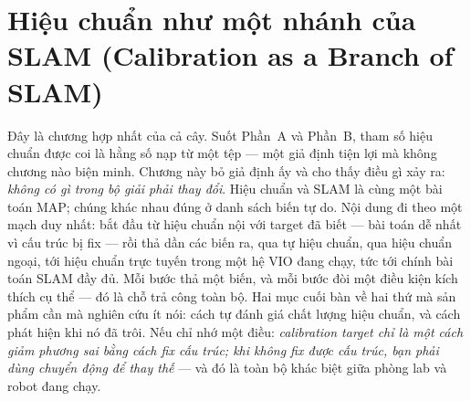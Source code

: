 \documentclass[../../vslam.tex]{subfiles}
\begin{document}
\chapter{Hiệu chuẩn như một nhánh của SLAM (Calibration as a Branch of SLAM)}

\begin{tomtat}
Đây là chương hợp nhất của cả cây. Suốt Phần~A và Phần~B, tham số hiệu chuẩn được coi là hằng số nạp từ một tệp --- một giả định tiện lợi mà không chương nào biện minh. Chương này bỏ giả định ấy và cho thấy điều gì xảy ra: \emph{không có gì trong bộ giải phải thay đổi}. Hiệu chuẩn và SLAM là cùng một bài toán MAP; chúng khác nhau đúng ở danh sách biến tự do. Nội dung đi theo một mạch duy nhất: bắt đầu từ hiệu chuẩn nội với target đã biết --- bài toán dễ nhất vì cấu trúc bị fix --- rồi thả dần các biến ra, qua tự hiệu chuẩn, qua hiệu chuẩn ngoại, tới hiệu chuẩn trực tuyến trong một hệ VIO đang chạy, tức tới chính bài toán SLAM đầy đủ. Mỗi bước thả một biến, và mỗi bước đòi một điều kiện kích thích cụ thể --- đó là chỗ  trả công toàn bộ. Hai mục cuối bàn về hai thứ mà sản phẩm cần mà nghiên cứu ít nói: cách tự đánh giá chất lượng hiệu chuẩn, và cách phát hiện khi nó đã trôi. Nếu chỉ nhớ một điều: \emph{calibration target chỉ là một cách giảm phương sai bằng cách fix cấu trúc; khi không fix được cấu trúc, bạn phải dùng chuyển động để thay thế} --- và đó là toàn bộ khác biệt giữa phòng lab và robot đang chạy.
\end{tomtat}
\end{document}
